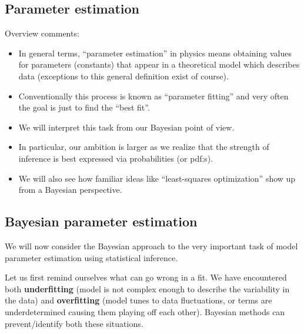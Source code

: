 \documentclass[%
oneside,                 %
final,                   %
10pt]{article}
\newenvironment{block_mdfboxadmon}[1][]{
\begin{block_mdfboxmdframed}[frametitle=#1]
}
{
\end{block_mdfboxmdframed}
}
\begin{document}
\subsection{Parameter estimation}

\begin{block_mdfboxadmon}[]
Overview comments:
\begin{itemize}
\item In general terms, ``parameter estimation'' in physics means obtaining values for parameters (constants) that appear in a theoretical model which describes data (exceptions to this general definition exist of course).

\item Conventionally this process is known as ``parameter fitting'' and very often the goal is just to find the ``best fit''.

\item We will interpret this task from our Bayesian point of view.

\item In particular, our ambition is larger as we realize that the strength of inference is best expressed via probabilities (or pdf:s).

\item We will also see how familiar ideas like ``least-squares optimization'' show up from a Bayesian perspective.
\end{itemize}

\noindent
\end{block_mdfboxadmon} %




\subsection{Bayesian parameter estimation}

\begin{block_mdfboxadmon}[]
We will now consider the Bayesian approach to the very important task of model parameter estimation using statistical inference. 

Let us first remind ourselves what can go wrong in a fit. We have encountered both \textbf{underfitting} (model is not complex enough to describe the variability in the data) and \textbf{overfitting} (model tunes to data fluctuations, or terms are underdetermined causing them playing off each other). Bayesian methods can prevent/identify both these situations.
\end{block_mdfboxadmon} %
\end{document}
